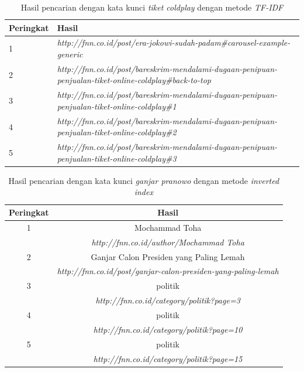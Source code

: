 \begin{table}[H]
\begin{center}
  \caption{\label{tabel:hasil_tfidf_coldplay} Hasil pencarian dengan kata kunci
  \textit{tiket coldplay} dengan metode \textit{TF-IDF}}
  \begin{tabular}{|p{0.7in}|p{4.5in}|} 
 \hline
  Peringkat & Hasil \\ 
 \hline
    1 & \textit{http://fnn.co.id/post/era-jokowi-sudah-padam\#carousel-example-generic} \\ 
 \hline
    2 & \textit{http://fnn.co.id/post/bareskrim-mendalami-dugaan-penipuan-penjualan-tiket-online-coldplay\#back-to-top} \\
 \hline
    3 & \textit{http://fnn.co.id/post/bareskrim-mendalami-dugaan-penipuan-penjualan-tiket-online-coldplay\#1} \\
 \hline
    4 & \textit{http://fnn.co.id/post/bareskrim-mendalami-dugaan-penipuan-penjualan-tiket-online-coldplay\#2} \\
 \hline
    5 & \textit{http://fnn.co.id/post/bareskrim-mendalami-dugaan-penipuan-penjualan-tiket-online-coldplay\#3} \\
 \hline
\end{tabular}
\end{center}
\end{table}


\begin{table}[H]
\begin{center}
  \caption{\label{tabel:hasil_inv_ganjar} Hasil pencarian dengan kata kunci
  \textit{ganjar pranowo} dengan metode \textit{inverted index}}
\begin{tabular}{|c|c|} 
 \hline
  Peringkat & Hasil \\ 
 \hline
  1 & Mochammad Toha \\ 
   & \textit{http://fnn.co.id/author/Mochammad Toha} \\
 \hline
  2 & Ganjar Calon Presiden yang Paling Lemah \\
   & \textit{http://fnn.co.id/post/ganjar-calon-presiden-yang-paling-lemah} \\
 \hline
  3 & politik \\
   & \textit{http://fnn.co.id/category/politik?page=3} \\
 \hline
  4 & politik \\
   & \textit{http://fnn.co.id/category/politik?page=10} \\
 \hline
  5 & politik \\
   & \textit{http://fnn.co.id/category/politik?page=15} \\
 \hline
\end{tabular}
\end{center}
\end{table}

